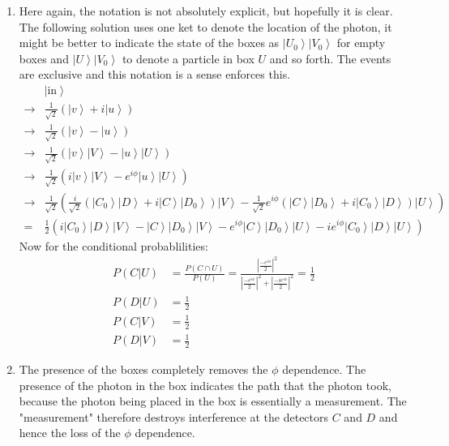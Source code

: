 \documentclass[12pt,a4]{article}
\begin{document}
\begin{enumerate}
\begin{enumerate}
      \item
        Here again, the notation is not absolutely explicit, but hopefully it is clear.
        The following solution uses one ket to denote the location of the photon, it might be better to indicate the state of the boxes as $\left| U_0 \right \rangle\left| V_0 \right \rangle$ for empty boxes and $\left| U \right \rangle\left| V_0 \right \rangle$ to denote a particle in box $U$ and so forth.
        The events are exclusive and this notation is a sense enforces this.
        \begin{align*}
              & \left| \text{in} \right\rangle \\
          \to & \frac{1}{\sqrt{2}} \left(\left| v \right \rangle + i \left| u \right \rangle \right) \\
          \to & \frac{1}{\sqrt{2}} \left(\left| v \right \rangle - \left| u \right \rangle \right) \\
          \to & \frac{1}{\sqrt{2}} \left(\left| v \right \rangle \left| V \right \rangle - \left| u \right \rangle \left| U \right \rangle\right) \\
          \to & \frac{1}{\sqrt{2}} \left(i\left| v \right \rangle \left| V \right \rangle - e^{i \phi}\left| u \right \rangle \left| U \right \rangle\right) \\
          \to & \frac{1}{\sqrt{2}} \left(\frac{i}{\sqrt{2}}\left(\left| C_0 \right \rangle \left| D \right \rangle + i \left| C \right \rangle \left| D_0 \right \rangle\right) \left| V \right \rangle - \frac{1}{\sqrt{2}} e^{i \phi}\left( \left| C \right \rangle\left| D_0 \right \rangle + i\left| C_0 \right \rangle \left| D \right \rangle \right) \left| U \right \rangle \right) \\
            = & \frac{1}{2} \left( i \left| C_0 \right \rangle \left| D \right \rangle \left| V \right \rangle - \left| C \right \rangle \left| D_0 \right \rangle \left| V \right \rangle - e^{i \phi} \left| C \right \rangle \left| D_0 \right \rangle \left| U \right \rangle - i e^{i \phi} \left| C_0 \right \rangle \left| D \right \rangle \left| U \right \rangle \right)
        \end{align*}
        Now for the conditional probablilities:
        \begin{align*}
          P(C | U) &= \frac{P(C \cap U)}{P(U)} = \frac{\left|\frac{-e^{i \phi}}{2}\right|^2}{\left|\frac{-e^{i \phi}}{2}\right|^2 + \left|\frac{-ie^{i \phi}}{2}\right|^2} = \frac{1}{2}\\
          P(D | U) &= \frac{1}{2}\\
          P(C | V) &= \frac{1}{2}\\
          P(D | V) &= \frac{1}{2}
        \end{align*}
      \item
        The presence of the boxes completely removes the $\phi$ dependence.
        The presence of the photon in the box indicates the path that the photon took, because the photon being placed in the box is essentially a measurement.
        The "measurement" therefore destroys interference at the detectors $C$ and $D$ and hence the loss of the $\phi$ dependence.


\end{enumerate}
\end{enumerate}
\end{document}

